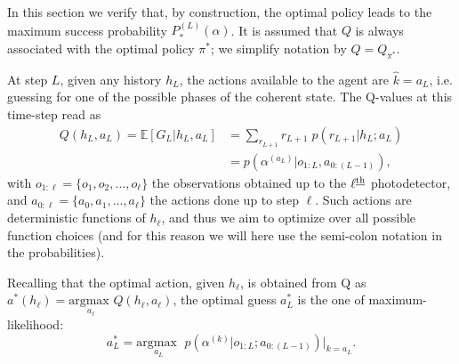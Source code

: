 In this section we verify that, by construction, the optimal policy leads to the maximum success probability $P^{(L)}_*(\alpha)$.
It is assumed that $Q$ is always associated with the optimal policy $\pi^{*}$; we simplify notation by $Q = Q_{\pi^{*}}$.

At step $L$, given any history $h_{L}$, the actions available to the agent are $\hat{k} = a_L$, i.e. guessing for one of the possible phases of the coherent state. The Q-values at this time-step read as
\begin{equation}
  \begin{aligned}
  Q(h_{L}, a_L) = \mathbb{E}[G_L | h_L, a_L] &= \sum_{r_{L+1}} r_{L+1} \; p(r_{L+1}| h_L; a_L) \\
    &=  p( \alpha ^{(a_L)} | o_{1:L}, a_{0:(L-1)}) ,
  \end{aligned}
\end{equation}
with $o_{1:\ell} = \{o_1, o_2, ..., o_{\ell}\}$ the observations obtained up to the $\ell^{\text{\underline{th}}}$ photodetector, and $a_{0:\ell} = \{a_0, a_1 , ..., a_\ell \}$ the actions done up to step $\ell$. Such actions are deterministic functions of $h_\ell$, and thus we aim to optimize over all possible function choices (and for this reason we will here use the semi-colon notation in the probabilities).

Recalling that the optimal action, given $h_{\ell}$, is obtained from Q as $a^{*}(h_{\ell}) = \underset{a_{\ell}}{\text{argmax }} Q(h_\ell, a_\ell)$, the optimal guess $a_L^{*}$ is the one of maximum-likelihood:
\begin{equation*}
    a^{*}_L = \underset{a_L}{\text{argmax }} \; p( \alpha ^{(k)} | o_{1:L}; a_{0:(L-1)}) \Big|_{k=a_{L}}.
\end{equation*}

